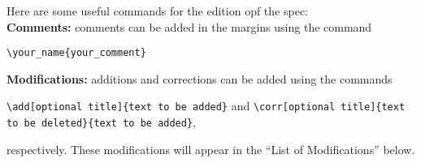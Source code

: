 Here are some useful commands for the edition opf the spec:\\

\noindent\textbf{Comments:} comments can be added in the margins using the command
\begin{center}
    \Verb|\your_name{your_comment}|
\end{center}

\noindent\textbf{Modifications:} additions and corrections can be added using the commands
\begin{center}
\Verb|\add[optional title]{text to be added}| and \Verb|\corr[optional title]{text to be deleted}{text to be added}|,
\end{center}

\noindent respectively.
These modifications will appear in the ``List of Modifications'' below.\\

\begingroup
    \let\cleardoublepage\relax
    \listofmodification
\endgroup
\newpage


